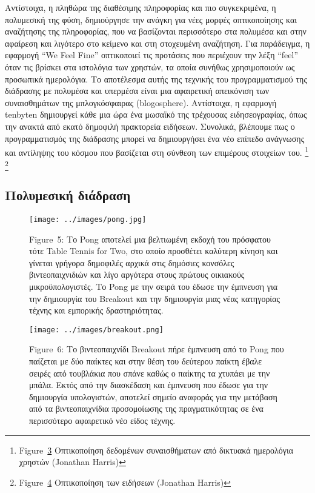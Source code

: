 \documentclass[
]{article}
\begin{document}
Αντίστοιχα, η πληθώρα της διαθέσιμης πληροφορίας και πιο συγκεκριμένα, η
πολυμεσική της φύση, δημιούργησε την ανάγκη για νέες μορφές
οπτικοποίησης και αναζήτησης της πληροφορίας, που να βασίζονται
περισσότερο στα πολυμέσα και στην αφαίρεση και λιγότερο στο κείμενο και
στη στοχευμένη αναζήτηση. Για παράδειγμα, η εφαρμογή ``We Feel Fine''
οπτικοποιεί τις προτάσεις που περιέχουν την λέξη ``feel'' όταν τις
βρίσκει στα ιστολόγια των χρηστών, τα οποία συνήθως χρησιμοποιούν ως
προσωπικά ημερολόγια. Το αποτέλεσμα αυτής της τεχνικής του
προγραμματισμού της διάδρασης με πολυμέσα και υπερμέσα είναι μια
αφαιρετική απεικόνιση των συναισθημάτων της μπλογκόσφαιρας
(blogosphere). Αντίστοιχα, η εφαρμογή tenbyten δημιουργεί κάθε μια ώρα
ένα μωσαϊκό της τρέχουσας ειδησεογραφίας, όπως την ανακτά από εκατό
δημοφιλή πρακτορεία ειδήσεων. Συνολικά, βλέπουμε πως ο προγραμματισμός
της διάδρασης μπορεί να δημιουργήσει ένα νέο επίπεδο ανάγνωσης και
αντίληψης του κόσμου που βασίζεται στη σύνθεση των επιμέρους στοιχείων
του. \footnote{Figure~\protect\hyperlink{fig:we-feel-fine}{3}
  Οπτικοποίηση δεδομένων συναισθήματων από δικτυακά ημερολόγια χρηστών
  (Jonathan Harris)} \footnote{Figure~\protect\hyperlink{fig:tenbyten}{4}
  Οπτικοποίηση των ειδήσεων (Jonathan Harris)}

\hypertarget{ux3c0ux3bfux3bbux3c5ux3bcux3b5ux3c3ux3b9ux3baux3ae-ux3b4ux3b9ux3acux3b4ux3c1ux3b1ux3c3ux3b7}{%
\subsection{Πολυμεσική
διάδραση}\label{ux3c0ux3bfux3bbux3c5ux3bcux3b5ux3c3ux3b9ux3baux3ae-ux3b4ux3b9ux3acux3b4ux3c1ux3b1ux3c3ux3b7}}

\leavevmode{}%
\begin{figure}
\hypertarget{fig:pong}{%
\centering
\texttt{[image: ../images/pong.jpg]}
\caption{Figure~5: Το Pong αποτελεί μια βελτιωμένη εκδοχή του πρόσφατου
τότε Table Tennis for Two, στο οποίο προσθέτει καλύτερη κίνηση και
γίνεται γρήγορα δημοφιλές αρχικά στις δημόσιες κονσόλες βιντεοπαιχνιδιών
και λίγο αργότερα στους πρώτους οικιακούς μικροϋπολογιστές. Tο Pong με
την σειρά του έδωσε την έμπνευση για την δημιουργία του Breakout και την
δημιουργία μιας νέας κατηγορίας τέχνης και εμπορικής
δραστηριότητας.}\label{fig:pong}
}
\end{figure}

\leavevmode{}%
\begin{figure}
\hypertarget{fig:breakout}{%
\centering
\texttt{[image: ../images/breakout.png]}
\caption{Figure~6: Το βιντεοπαιχνίδι Breakout πήρε έμπνευση από το Pong
που παίζεται με δύο παίκτες και στην θέση του δεύτερου παίκτη έβαλε
σειρές από τουβλάκια που σπάνε καθώς ο παίκτης τα χτυπάει με την μπάλα.
Εκτός από την διασκέδαση και έμπνευση που έδωσε για την δημιουργία
υπολογιστών, αποτελεί σημείο αναφοράς για την μετάβαση από τα
βιντεοπαιχνίδια προσομοίωσης της πραγματικότητας σε ένα περισσότερο
αφαιρετικό νέο είδος τέχνης.}\label{fig:breakout}
}
\end{figure}
\end{document}

